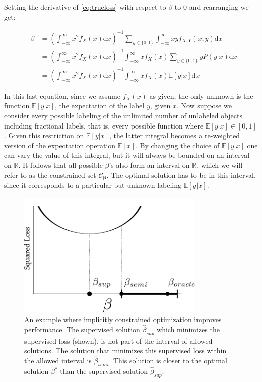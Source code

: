 \documentclass{elsarticle}
\begin{document}
\begin{pf}

Setting the derivative of \eqref{eq:trueloss} with respect to $\beta$ to $0$ and rearranging we get:

\begin{eqnarray}
&\beta & = \left( \int_{-\infty}^{\infty} { x^2 f_X(x) \mathrm{d}x} \right)^{-1} \sum_{y \in \{0,1\}} \int_{-\infty}^{\infty} { x y f_{X,Y}(x,y) \mathrm{d}x } \\
& & =    \left( \int_{-\infty}^{\infty} { x^2 f_X(x) \mathrm{d}x} \right)^{-1}  \int_{-\infty}^{\infty} { x f_X(x) \sum_{y \in \{0,1\}} y P(y|x) \mathrm{d}x} \\
& & =   \left( \int_{-\infty}^{\infty} { x^2 f_X(x) \mathrm{d}x} \right)^{-1}  \int_{-\infty}^{\infty} { x f_X(x) \mathbb{E}[y|x] \mathrm{d}x} \label{eqn:sslsolution}
\end{eqnarray}

In this last equation, since we assume $f_X(x)$ as given, the only unknown is the function $\mathbb{E}[y|x]$, the expectation of the label $y$, given $x$. Now suppose we consider every possible labeling of the unlimited number of unlabeled objects including fractional labels, that is, every possible function where $\mathbb{E}[y|x] \in [0,1]$. Given this restriction on $\mathbb{E}[y|x]$, the latter integral becomes a re-weighted version of the expectation operation $\mathbb{E}[x]$. By changing the choice of $\mathbb{E}[y|x]$ one can vary the value of this integral, but it will always be bounded on an interval on $\mathbb{R}$. It follows that all possible $\beta$'s also form an interval on $\mathbb{R}$, which we will refer to as the constrained set $\mathcal{C}_{\boldsymbol{\beta}}$. The optimal solution has to be in this interval, since it corresponds to a particular but unknown labeling $\mathbb{E}[y|x]$.

\begin{figure}[!ht] 
  \centering
      \includegraphics[width=0.8\textwidth]{1Dconstrainedspace.pdf}
  \caption{An example where implicitly constrained optimization improves performance. The supervised solution $\hat{\beta}_{sup}$ which minimizes the supervised loss (shown), is not part of the interval of allowed solutions. The solution that minimizes this supervised loss within the allowed interval is $\hat{\beta}_{semi}$. This solution is closer to the optimal solution ${\beta}^{\ast}$ than the supervised solution $\hat{\beta}_{sup}$.} \label{fig:constrainedproblem}
\end{figure}


\end{pf}
\end{document}
